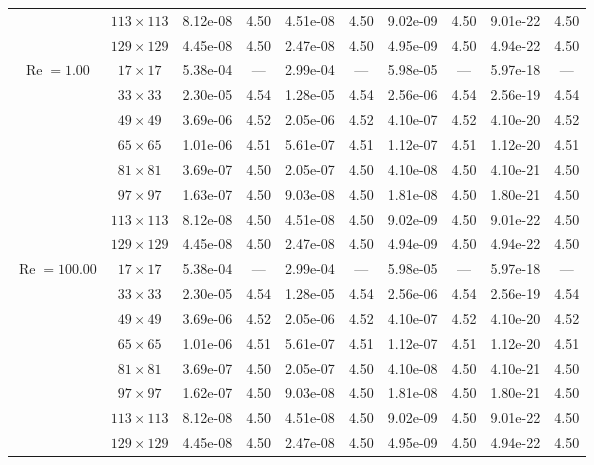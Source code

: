\documentclass[preprint, 12pt]{elsarticle}
\begin{document}
\begin{center}
\begin{table}[H]
{\begin{tabular*}{\textwidth}{@{\extracolsep\fill}cccccccccc@{}}
    & $113\times 113$ & 8.12e-08 & 4.50 & 4.51e-08 & 4.50 & 9.02e-09 & 4.50 & 9.01e-22 & 4.50 \\
    & $129\times 129$ & 4.45e-08 & 4.50 & 2.47e-08 & 4.50 & 4.95e-09 & 4.50 & 4.94e-22 & 4.50 \\
    \hline\hline
    \multirow{7}{*}{$\operatorname{Re}=1.00$} & $17\times 17$ & 5.38e-04 & --- & 2.99e-04 & --- & 5.98e-05 & --- & 5.97e-18 & --- \\
    & $33\times 33$ & 2.30e-05 & 4.54 & 1.28e-05 & 4.54 & 2.56e-06 & 4.54 & 2.56e-19 & 4.54 \\
    & $49\times 49$ & 3.69e-06 & 4.52 & 2.05e-06 & 4.52 & 4.10e-07 & 4.52 & 4.10e-20 & 4.52 \\
    \multirow{3}{*}{$\operatorname{Wi}=10$} & $65\times 65$ & 1.01e-06 & 4.51 & 5.61e-07 & 4.51 & 1.12e-07 & 4.51 & 1.12e-20 & 4.51 \\
    & $81\times 81$ & 3.69e-07 & 4.50 & 2.05e-07 & 4.50 & 4.10e-08 & 4.50 & 4.10e-21 & 4.50 \\
    & $97\times 97$ & 1.63e-07 & 4.50 & 9.03e-08 & 4.50 & 1.81e-08 & 4.50 & 1.80e-21 & 4.50 \\
    & $113\times 113$ & 8.12e-08 & 4.50 & 4.51e-08 & 4.50 & 9.02e-09 & 4.50 & 9.01e-22 & 4.50 \\
    & $129\times 129$ & 4.45e-08 & 4.50 & 2.47e-08 & 4.50 & 4.94e-09 & 4.50 & 4.94e-22 & 4.50 \\
    \hline
    \multirow{7}{*}{$\operatorname{Re}=100.00$} & $17\times 17$ & 5.38e-04 & --- & 2.99e-04 & --- & 5.98e-05 & --- & 5.97e-18 & --- \\
    & $33\times 33$ & 2.30e-05 & 4.54 & 1.28e-05 & 4.54 & 2.56e-06 & 4.54 & 2.56e-19 & 4.54 \\
    & $49\times 49$ & 3.69e-06 & 4.52 & 2.05e-06 & 4.52 & 4.10e-07 & 4.52 & 4.10e-20 & 4.52 \\
    \multirow{3}{*}{$\operatorname{Wi}=10$} & $65\times 65$ & 1.01e-06 & 4.51 & 5.61e-07 & 4.51 & 1.12e-07 & 4.51 & 1.12e-20 & 4.51 \\
    & $81\times 81$ & 3.69e-07 & 4.50 & 2.05e-07 & 4.50 & 4.10e-08 & 4.50 & 4.10e-21 & 4.50 \\
    & $97\times 97$ & 1.62e-07 & 4.50 & 9.03e-08 & 4.50 & 1.81e-08 & 4.50 & 1.80e-21 & 4.50 \\
    & $113\times 113$ & 8.12e-08 & 4.50 & 4.51e-08 & 4.50 & 9.02e-09 & 4.50 & 9.01e-22 & 4.50 \\
    & $129\times 129$ & 4.45e-08 & 4.50 & 2.47e-08 & 4.50 & 4.95e-09 & 4.50 & 4.94e-22 & 4.50 \\

\end{tabular*}}
\end{table}
\end{center}
\end{document}
